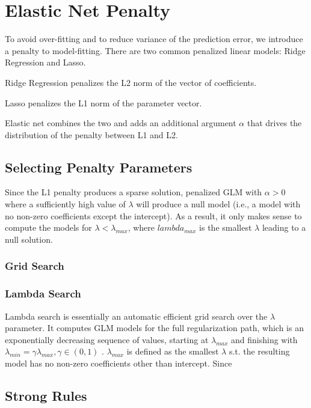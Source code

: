 \documentclass[11pt]{article}
\begin{document}
\section{Elastic Net Penalty} 
To avoid over-fitting and to reduce variance of the prediction error, we introduce a penalty to model-fitting. There are two common penalized linear models: Ridge Regression and Lasso. 

Ridge Regression penalizes the L2 norm of the vector of coefficients. 

Lasso penalizes the L1 norm of the parameter vector.

Elastic net combines the two and adds an additional argument $\alpha$ that drives the distribution of the penalty between L1 and L2.

\subsection{Selecting Penalty Parameters}

Since the L1 penalty produces a sparse solution, penalized GLM with  $\alpha > 0$ where a sufficiently high value of $\lambda$ will produce a null model (i.e., a model with no non-zero coefficients except the intercept). As a result, it only makes sense to compute the models for $\lambda < \lambda_{max}$, where $lambda_{max}$ is the smallest $\lambda$ leading to a null solution.

\subsubsection{Grid Search}
\subsubsection{Lambda Search}
Lambda search is essentially an automatic efficient grid search over the $\lambda$ parameter. It computes GLM models for the full regularization path, which is an exponentially decreasing sequence of values, starting at $\lambda_{max}$ and finishing with $\lambda_{min} = \gamma\lambda_{max}, \gamma \in (0,1)$ . $\lambda_{max}$ is defined as the smallest $\lambda$ s.t. the resulting model has no non-zero coefficients other than intercept. Since 



\subsection{Strong Rules}
\end{document}
